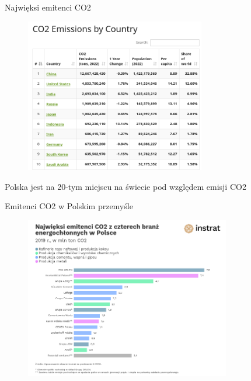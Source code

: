 \begin{frame}{Najwięksi emitenci CO2}
    \begin{figure}
        \includegraphics[width=0.7\textwidth]{images/top_polluters_table.png}
    \end{figure}
    Polska jest na 20-tym miejscu na świecie pod względem emisji CO2
\end{frame}

\begin{frame}{Emitenci CO2 w Polskim przemyśle}
    \begin{figure}
        \includegraphics[width=0.8\textwidth]{images/top_polluters_poland.png}
    \end{figure}
\end{frame}


